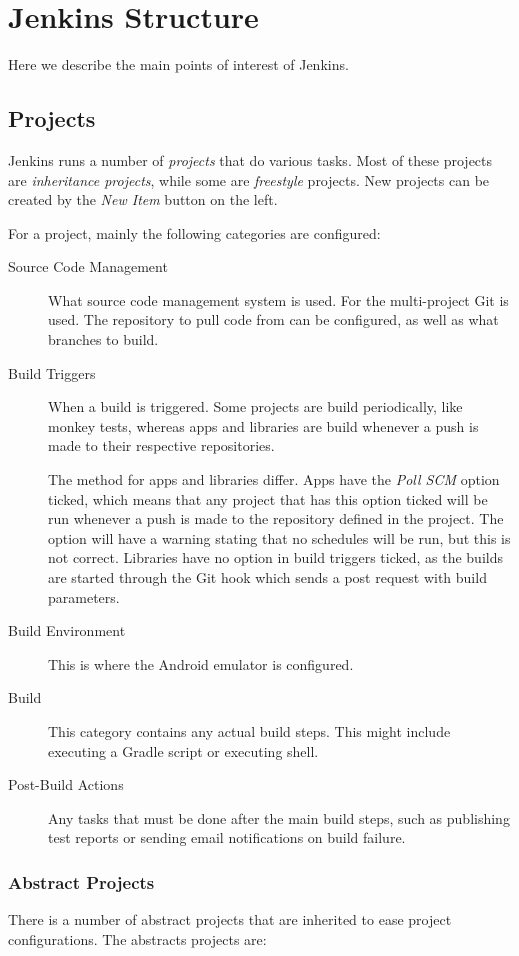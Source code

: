 \chapter{Jenkins Structure}\label{app:jenkins_structure}
Here we describe the main points of interest of Jenkins.

\section{Projects}
Jenkins runs a number of \emph{projects} that do various tasks. Most of these projects are \emph{inheritance projects}, while some are \emph{freestyle} projects. New projects can be created by the \emph{New Item} button on the left.

For a project, mainly the following categories are configured:

\begin{description}
  \item[Source Code Management] What source code management system is used. For the multi-project Git is used. The repository to pull code from can be configured, as well as what branches to build.
  \item[Build Triggers] When a build is triggered. Some projects are build periodically, like monkey tests, whereas apps and libraries are build whenever a push is made to their respective repositories.

  The method for apps and libraries differ. Apps have the \emph{Poll SCM} option ticked, which means that any project that has this option ticked will be run whenever a push is made to the repository defined in the project. The option will have a warning stating that no schedules will be run, but this is not correct. Libraries have no option in build triggers ticked, as the builds are started through the Git hook which sends a post request with build parameters.
  \item[Build Environment] This is where the Android emulator is configured.
  \item[Build] This category contains any actual build steps. This might include executing a Gradle script or executing shell.
  \item[Post-Build Actions] Any tasks that must be done after the main build steps, such as publishing test reports or sending email notifications on build failure.
\end{description}

\subsection{Abstract Projects}
There is a number of abstract projects that are inherited to ease project configurations. The abstracts projects are:

